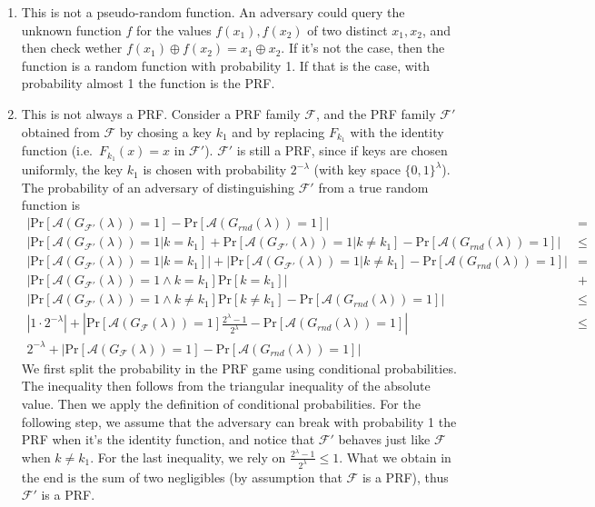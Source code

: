 \documentclass{article}
\newcommand{\adversary}{\mathcal{A}}
\newcommand{\prf}{\mathcal{F}}
\newcommand{\xor}{\oplus}
\renewcommand{\Pr}[1]{\ensuremath{\mathrm{Pr} \left[ {#1} \right]}}
\newcommand{\abs}[1]{\left| {#1} \right|}
\begin{document}
\begin{enumerate}
	\item This is not a pseudo-random function.
		An adversary could query the unknown function $f$ for the values $f(x_1), f(x_2)$ of two distinct $x_1, x_2$, and then check wether $f(x_1) \xor f(x_2) = x_1 \xor x_2$.
		If it's not the case, then the function is a random function with probability 1.
		If that is the case, with probability almost 1 the function is the PRF.
	\item This is not always a PRF.
		Consider a PRF family $\prf$, and the PRF family $\prf'$ obtained from $\prf$ by chosing a key $k_1$ and by replacing $F_{k_1}$ with the identity function (i.e.\ $F_{k_1}(x) = x$ in $\prf'$).
		$\prf'$ is still a PRF, since if keys are chosen uniformly, the key $k_1$ is chosen with probability $2^{-\lambda}$ (with key space $\{0,1\}^{\lambda}$).
		The probability of an adversary of distinguishing $\prf'$ from a true random function is
		\begin{align*}
			\abs{\Pr{\adversary(G_{\prf'}(\lambda)) = 1} - \Pr{\adversary(G_{rnd}(\lambda))=1}} & = \\
			\abs{\Pr{\adversary(G_{\prf'}(\lambda)) = 1 | k = k_1 } + \Pr{\adversary(G_{\prf'}(\lambda)) = 1 | k \neq k_1} - \Pr{\adversary(G_{rnd}(\lambda))=1}} & \le \\
			\abs{\Pr{\adversary(G_{\prf'}(\lambda)) = 1 | k = k_1 }} + \abs{\Pr{\adversary(G_{\prf'}(\lambda)) = 1 | k \neq k_1} - \Pr{\adversary(G_{rnd}(\lambda))=1}} & = \\
			\abs{\Pr{\adversary(G_{\prf'}(\lambda)) = 1 \land k = k_1 } \Pr{k = k_1}} & + \\
			\abs{\Pr{\adversary(G_{\prf'}(\lambda)) = 1 \land k \neq k_1}\Pr{k \neq k_1} - \Pr{\adversary(G_{rnd}(\lambda))=1}} & \le \\
			\abs{1 \cdot 2^{-\lambda}} + \abs{\Pr{\adversary(G_{\prf}(\lambda)) = 1} \frac{2^{\lambda}-1}{2^{\lambda}} - \Pr{\adversary(G_{rnd}(\lambda))=1}} & \le \\
			2^{-\lambda} +
			\abs{\Pr{\adversary(G_{\prf}(\lambda)) = 1} - \Pr{\adversary(G_{rnd}(\lambda))=1}} &
		\end{align*}
		We first split the probability in the PRF game using conditional probabilities.
		The inequality then follows from the triangular inequality of the absolute value.
		Then we apply the definition of conditional probabilities.
		For the following step, we assume that the adversary can break with probability 1 the PRF when it's the identity function, and notice that $\prf'$ behaves just like $\prf$ when $k \neq k_1$.
		For the last inequality, we rely on $\frac{2^{\lambda}-1}{2^{\lambda}} \le 1$.
		What we obtain in the end is the sum of two negligibles (by assumption that $\prf$ is a PRF), thus $\prf'$ is a PRF.


\end{enumerate}
\end{document}

